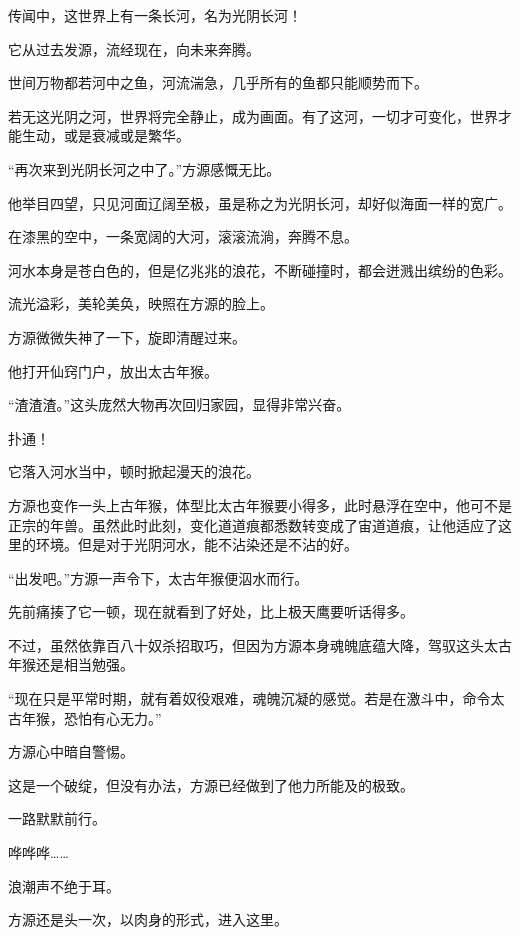 
\begin{this_body}



传闻中，这世界上有一条长河，名为光阴长河！

它从过去发源，流经现在，向未来奔腾。

世间万物都若河中之鱼，河流湍急，几乎所有的鱼都只能顺势而下。

若无这光阴之河，世界将完全静止，成为画面。有了这河，一切才可变化，世界才能生动，或是衰减或是繁华。

“再次来到光阴长河之中了。”方源感慨无比。

他举目四望，只见河面辽阔至极，虽是称之为光阴长河，却好似海面一样的宽广。

在漆黑的空中，一条宽阔的大河，滚滚流淌，奔腾不息。

河水本身是苍白色的，但是亿兆兆的浪花，不断碰撞时，都会迸溅出缤纷的色彩。

流光溢彩，美轮美奂，映照在方源的脸上。

方源微微失神了一下，旋即清醒过来。

他打开仙窍门户，放出太古年猴。

“渣渣渣。”这头庞然大物再次回归家园，显得非常兴奋。

扑通！

它落入河水当中，顿时掀起漫天的浪花。

方源也变作一头上古年猴，体型比太古年猴要小得多，此时悬浮在空中，他可不是正宗的年兽。虽然此时此刻，变化道道痕都悉数转变成了宙道道痕，让他适应了这里的环境。但是对于光阴河水，能不沾染还是不沾的好。

“出发吧。”方源一声令下，太古年猴便泅水而行。

先前痛揍了它一顿，现在就看到了好处，比上极天鹰要听话得多。

不过，虽然依靠百八十奴杀招取巧，但因为方源本身魂魄底蕴大降，驾驭这头太古年猴还是相当勉强。

“现在只是平常时期，就有着奴役艰难，魂魄沉凝的感觉。若是在激斗中，命令太古年猴，恐怕有心无力。”

方源心中暗自警惕。

这是一个破绽，但没有办法，方源已经做到了他力所能及的极致。

一路默默前行。

哗哗哗……

浪潮声不绝于耳。

方源还是头一次，以肉身的形式，进入这里。


\end{this_body}
